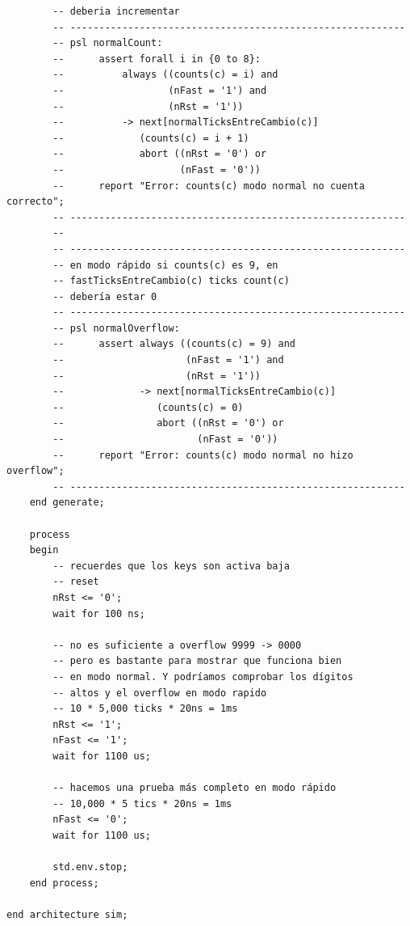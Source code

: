\documentclass[a4paper]{article}
\begin{document}
\begin{verbatim}
        -- deberia incrementar
        -- ----------------------------------------------------------
        -- psl normalCount:
        --      assert forall i in {0 to 8}:
        --          always ((counts(c) = i) and
        --                  (nFast = '1') and
        --                  (nRst = '1'))
        --          -> next[normalTicksEntreCambio(c)]
        --             (counts(c) = i + 1)
        --             abort ((nRst = '0') or
        --                    (nFast = '0'))
        --      report "Error: counts(c) modo normal no cuenta correcto";
        -- ----------------------------------------------------------
        --
        -- ----------------------------------------------------------
        -- en modo rápido si counts(c) es 9, en
        -- fastTicksEntreCambio(c) ticks count(c)
        -- debería estar 0
        -- ----------------------------------------------------------
        -- psl normalOverflow:
        --      assert always ((counts(c) = 9) and
        --                     (nFast = '1') and
        --                     (nRst = '1'))
        --             -> next[normalTicksEntreCambio(c)]
        --                (counts(c) = 0)
        --                abort ((nRst = '0') or
        --                       (nFast = '0'))
        --      report "Error: counts(c) modo normal no hizo overflow";
        -- ----------------------------------------------------------
    end generate;

    process
    begin
        -- recuerdes que los keys son activa baja
        -- reset
        nRst <= '0';
        wait for 100 ns;

        -- no es suficiente a overflow 9999 -> 0000
        -- pero es bastante para mostrar que funciona bien
        -- en modo normal. Y podríamos comprobar los dígitos
        -- altos y el overflow en modo rapido
        -- 10 * 5,000 ticks * 20ns = 1ms
        nRst <= '1';
        nFast <= '1';
        wait for 1100 us;

        -- hacemos una prueba más completo en modo rápido
        -- 10,000 * 5 tics * 20ns = 1ms
        nFast <= '0';
        wait for 1100 us;

        std.env.stop;
    end process;

end architecture sim;
\end{verbatim}
\end{document}
